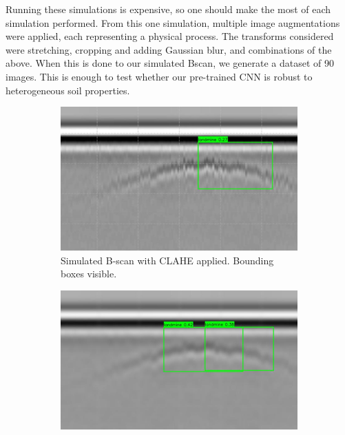         Running these simulations is expensive, so one should make the most of each simulation performed. From this one simulation, multiple image augmentations were applied, each representing a physical process. The transforms considered were stretching, cropping and adding Gaussian blur, and combinations of the above. When this is done to our simulated Bscan, we generate a dataset of 90 images. This is enough to test whether our pre-trained CNN is robust to heterogeneous soil properties.
        \begin{figure}[htbp]
            \centering
            
            \begin{subfigure}[b]{0.32\textwidth}
                \centering
                \includegraphics[width=\textwidth]{figs/Rory/sim_bscan_clahe_detection_cropped.png}
                \caption{Simulated B-scan with CLAHE applied. Bounding boxes visible.}
                \label{fig:bscan_clahe}
            \end{subfigure}
            \hfill
            \begin{subfigure}[b]{0.32\textwidth}
                \centering
                \includegraphics[width=\textwidth]{figs/Rory/sim_bscan_clahe_detection_blur_cropped.png}

\end{subfigure}
\end{figure}
